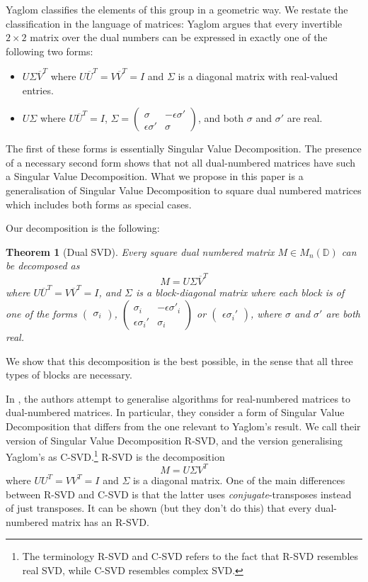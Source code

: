 \documentclass[
]{article}
\theoremstyle{theorem}
\newtheorem*{theorem}{Theorem}
\theoremstyle{proposition}
\begin{document}
Yaglom classifies the elements of this group in a geometric way. We restate the classification in the language of matrices: Yaglom argues that every invertible $2 \times 2$ matrix over the dual numbers can be expressed in exactly one of the following two forms:

\begin{itemize}
\item
  \(U \Sigma \overline V^T\) where \(U\overline U^T = V\overline V^T = I\) and \(\Sigma\) is a diagonal matrix with real-valued entries.
\item
  \(U \Sigma\) where \(U\overline U^T = I\), \(\Sigma = \begin{pmatrix} \sigma & -\epsilon\sigma' \\ \epsilon \sigma' & \sigma\end{pmatrix}\), and both $\sigma$ and $\sigma'$ are real.
\end{itemize}

The first of these forms is essentially Singular Value Decomposition. The presence of a necessary second form shows that not all dual-numbered matrices have such a Singular Value Decomposition. What we propose in this paper is a generalisation of Singular Value Decomposition to square dual numbered matrices which includes both forms as special cases.

Our decomposition is the following:

\begin{theorem}[Dual SVD]
  Every square dual numbered matrix \(M \in M_n(\mathbb D)\) can be decomposed as \[M = U\Sigma \overline V^T\] where \(U\overline U^T = V\overline V^T = I\), and \(\Sigma\) is a block-diagonal matrix where each block is of one of the forms \(\begin{pmatrix}\sigma_i\end{pmatrix}\), \(\begin{pmatrix}\sigma_i & -\epsilon \sigma'_i \\ \epsilon\sigma_i' & \sigma_i\end{pmatrix}\) or \(\begin{pmatrix} \epsilon\sigma_i'\end{pmatrix}\), where $\sigma$ and $\sigma'$ are both real.
\end{theorem}
We show that this decomposition is the best possible, in the sense that all three types of blocks are necessary.

In \cite{dualmatrix}, the authors attempt to generalise algorithms for real-numbered matrices to dual-numbered matrices. In particular, they consider a form of Singular Value Decomposition that differs from the one relevant to Yaglom's result. We call their version of Singular Value Decomposition R-SVD, and the version generalising Yaglom's as C-SVD.\footnote{The terminology R-SVD and C-SVD refers to the fact that R-SVD resembles real SVD, while C-SVD resembles complex SVD.} R-SVD is the decomposition \[M = U \Sigma V^T\] where \(UU^T = VV^T = I\) and \(\Sigma\) is a diagonal matrix. One of the main differences between R-SVD and C-SVD is that the latter uses \emph{conjugate}-transposes instead of just transposes. It can be shown (but they don't do this) that every dual-numbered matrix has an R-SVD.
\end{document}
